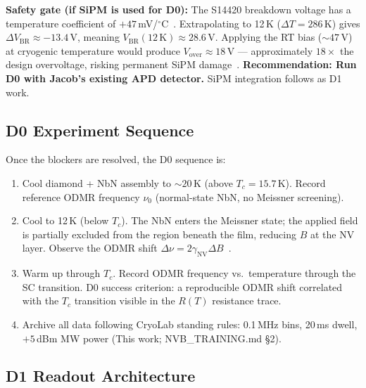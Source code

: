 \textbf{Safety gate (if SiPM is used for D0):} The S14420 breakdown voltage has a
temperature coefficient of $+47$\,mV/$^\circ$C~\cite{S14420datasheet}. %
Extrapolating to 12\,K ($\Delta T = 286$\,K) gives
$\Delta V_{\text{BR}} \approx -13.4$\,V, meaning
$V_{\text{BR}}(12\,\text{K}) \approx 28.6$\,V. %
Applying the RT bias ($\sim\!47$\,V) at cryogenic temperature would produce
$V_{\text{over}} \approx 18$\,V --- approximately $18\times$ the design overvoltage,
risking permanent SiPM damage~\cite{SiPMcryoSubmeV2025}. %
\textbf{Recommendation: Run D0 with Jacob's existing APD detector.}
SiPM integration follows as D1 work.

\subsection{D0 Experiment Sequence}
\label{sec:d0_sequence}

Once the blockers are resolved, the D0 sequence is:

\begin{enumerate}
  \item Cool diamond + NbN assembly to $\sim\!20$\,K (above $T_c = 15.7$\,K).
    Record reference ODMR frequency $\nu_0$ (normal-state NbN, no Meissner screening).
  \item Cool to 12\,K (below $T_c$). The NbN enters the Meissner state; the applied field
    is partially excluded from the region beneath the film, reducing $B$ at the NV layer.
    Observe the ODMR shift $\Delta\nu = 2\gamma_{\text{NV}} \Delta B$~\cite{Barry2020}. %
  \item Warm up through $T_c$. Record ODMR frequency vs.\ temperature through the SC
    transition. D0 success criterion: a reproducible ODMR shift correlated with the $T_c$
    transition visible in the $R(T)$ resistance trace.
  \item Archive all data following CryoLab standing rules: 0.1\,MHz bins, 20\,ms dwell,
    $+5$\,dBm MW power (This work; NVB\_TRAINING.md \S2).
\end{enumerate}

\subsection{D1 Readout Architecture}
\label{sec:d1_arch}

